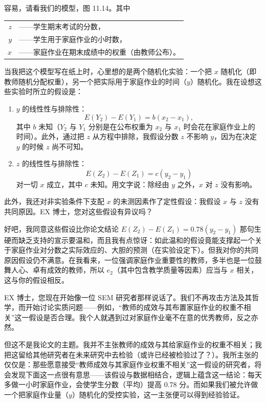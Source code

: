 容易，请看我们的模型，图 11.14。其中

\begin{center}
\begin{tabular}{r@{\quad}l}
$z$ & ——学生期末考试的分数，\\
$y$ & ——学生用于家庭作业的小时数，\\
$x$ & ——家庭作业在期末成绩中的权重（由教师公布）。
\end{tabular}
\end{center}

当我把这个模型写在纸上时，心里想的是两个随机化实验：一个把 $x$ 随机化（即教师随机分配权重），另一个把实际用于家庭作业的时间（$y$）随机化。我在设想这些实验时所立的假设是：

\begin{enumerate}[label=\arabic*.,leftmargin=1.8em]
\item $y$ 的线性性与排除性：
\[
E(Y_2)-E(Y_1)=b(x_2-x_1),
\]
其中 $b$ 未知（$Y_2$ 与 $Y_1$ 分别是在公布权重为 $x_2$ 与 $x_1$ 时会花在家庭作业上的时间）。此外，通过把 $z$ 从方程中排除，我假设分数 $z$ 不影响 $y$，因为在决定 $y$ 的时候 $z$ 尚不可知。
\item $z$ 的线性性与排除性：
\[
E(Z_2)-E(Z_1)=c(y_2-y_1)
\]
对一切 $x$ 成立，其中 $c$ 未知。用文字说：除经由 $y$ 之外，$x$ 对 $z$ 没有影响。
\end{enumerate}

此外，我还对非实验条件下支配 $x$ 的未测因素作了定性假设：我假设 $x$ 与 $z$ 没有共同原因。EX 博士，您对这些假设有异议吗？

好吧，我同意这些假设比你论文结论 $E(Z_2)-E(Z_1)=0.78(y_2-y_1)$ 那句生硬而缺乏支持的宣示要温和，而且我有点惊讶：如此温和的假设竟能支撑起一个关于家庭作业对分数之实际效应的、大胆的预测（在实验设定下）。但我对你的共同原因假设仍不满意。在我看来，一位强调家庭作业重要性的教师，多半也是一位鼓舞人心、卓有成效的教师，所以 $e_2$（其中包含教学质量等因素）应当与 $x$ 相关，这与你的假设相反。

EX 博士，您现在开始像一位 SEM 研究者那样说话了。我们不再攻击方法及其哲学，而开始讨论实质问题——例如，“教师的成效与其布置家庭作业的权重不相关”这一假设是否合理。我个人就遇到过对家庭作业毫不在意的优秀教师，反之亦然。

但这不是我论文的主题。我并不主张教师的成效与其给家庭作业的权重不相关；我把这留给其他研究者在未来研究中去检验（或许已经被检验过了？）。我所主张的仅仅是：那些愿意接受“教师成效与其家庭作业权重不相关”这一假设的研究者，将会发现下面这一点很有意思——该假设与数据相结合，逻辑上蕴含这一结论：每天多做一小时家庭作业，会使学生分数（平均）提高 0.78 分。而如果我们被允许做一个把家庭作业量（$y$）随机化的受控实验，这一主张便可以得到经验验证。

